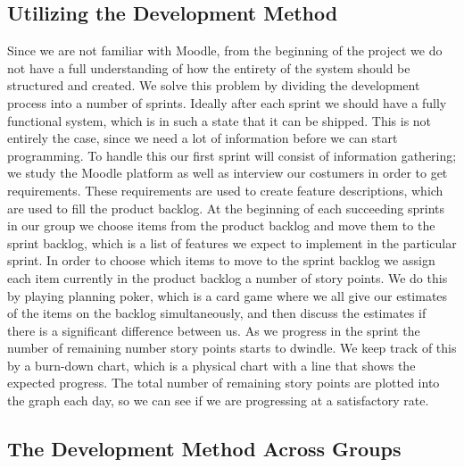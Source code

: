\subsection{Utilizing the Development Method}
Since we are not familiar with Moodle, from the beginning of the project we do not have a full understanding of how the entirety of the system should be structured and created.
We solve this problem by dividing the development process into a number of sprints.
Ideally after each sprint we should have a fully functional system, which is in such a state that it can be shipped.
This is not entirely the case, since we need a lot of information before we can start programming.
To handle this our first sprint will consist of information gathering; we study the Moodle platform as well as interview our costumers in order to get requirements.
These requirements are used to create feature descriptions, which are used to fill the product backlog.
At the beginning of each succeeding sprints in our group we choose items from the product backlog and move them to the sprint backlog, which is a list of features we expect to implement in the particular sprint.
In order to choose which items to move to the sprint backlog we assign each item currently in the product backlog a number of story points.
We do this by playing planning poker, which is a card game where we all give our estimates of the items on the backlog simultaneously, and then discuss the estimates if there is a significant difference between us.
As we progress in the sprint the number of remaining number story points starts to dwindle. 
We keep track of this by a burn-down chart, which is a physical chart with a line that shows the expected progress.
The total number of remaining story points are plotted into the graph each day, so we can see if we are progressing at a satisfactory rate.

\subsection{The Development Method Across Groups} %









